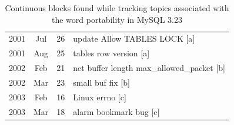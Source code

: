 \documentclass[titlepage,usenames,a4,landscape,semhelv]{seminar}
\begin{document}
\begin{slide}
\begin{itemize}
\begin{itemize}
\newslide

\begin{table}
\centering
\begin{tabular}{|ccc|l|}

\hline
2001 &	Jul &	26 &		update Allow TABLES LOCK [a] \\ 

2001 &	Aug &	25 &		tables row version [a] \\
\hline
\hline
2002 &	Feb &	21 &		net buffer length	max\_allowed\_packet [b] \\
2002 &	Mar &	23 &		small buf fix [b]	\\
\hline
\hline
2003 &	Feb &	16 &		Linux errno	[c] \\
2003 &	Mar &	18 &		alarm bookmark bug [c] \\
\hline
\end{tabular}
\caption{Continuous blocks found while tracking topics associated with the word portability in MySQL 3.23}
\label{tab:portability}
\end{table}

\newslide



\end{itemize}
\end{itemize}
\end{slide}
\end{document}
